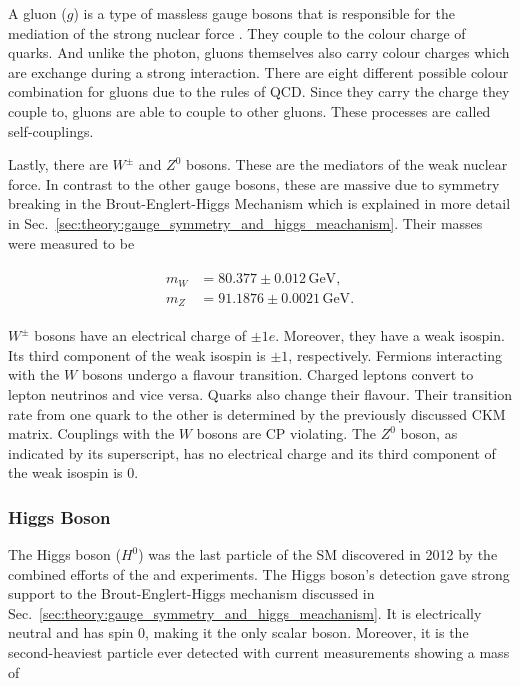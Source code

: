 \documentclass[bachelor,ngerman,english]{GAUBM}
\begin{document}
A gluon ($g$) is a type of massless gauge bosons that is responsible for the mediation of the strong nuclear force \cite{theory:qcd_01}. They couple to the colour charge of quarks. And unlike the photon, gluons themselves also carry colour charges which are exchange during a strong interaction. There are eight different possible colour combination for gluons due to the rules of QCD. Since they carry the charge they couple to, gluons are able to couple to other gluons. These processes are called self-couplings.

Lastly, there are $W^\pm$ and $Z^0$ bosons. These are the mediators of the weak nuclear force. In contrast to the other gauge bosons, these are massive due to symmetry breaking in the Brout-Englert-Higgs Mechanism which is explained in more detail in Sec.~\ref{sec:theory:gauge_symmetry_and_higgs_meachanism}. Their masses were measured to be \cite{pdg}

\begin{gather}
    \begin{aligned}
        m_W &= 80.377\pm0.012\,\text{GeV},\\
        m_Z &= 91.1876\pm0.0021\,\text{GeV}. 
        \label{eq:mass_wz}
    \end{aligned}
\end{gather}

$W^\pm$ bosons have an electrical charge of $\pm1e$. Moreover, they have a weak isospin. Its third component of the weak isospin is $\pm1$, respectively. Fermions interacting with the $W$ bosons undergo a flavour transition. Charged leptons convert to lepton neutrinos and vice versa. Quarks also change their flavour. Their transition rate from one quark to the other is determined by the previously discussed CKM matrix. Couplings with the $W$ bosons are CP violating. The $Z^0$ boson, as indicated by its superscript, has no electrical charge and its third component of the weak isospin is 0. 

\subsubsection*{Higgs Boson}
The Higgs boson ($H^0$) was the last particle of the SM discovered in 2012 by the combined efforts of the \atlas \cite{theory:higgs_discovery_01} and \cms \cite{theory:higgs_discovery_02} experiments. The Higgs boson's detection gave strong support to the Brout-Englert-Higgs mechanism discussed in Sec.~\ref{sec:theory:gauge_symmetry_and_higgs_meachanism}. It is electrically neutral and has spin 0, making it the only scalar boson. Moreover, it is the second-heaviest particle ever detected with current measurements \cite{pdg} showing a mass of 
\end{document}
